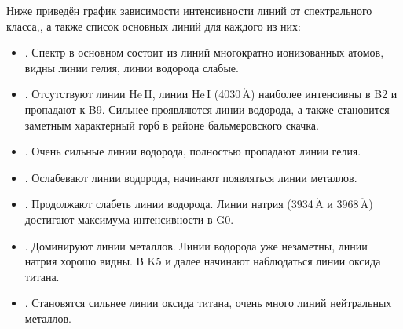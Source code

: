 Ниже приведён график зависимости интенсивности линий от спектрального класса,, а также список основных линий для каждого из них:
\begin{itemize}
	\item {}. Спектр в основном состоит из линий  многократно ионизованных атомов, видны линии гелия, линии водорода слабые.
	\item {}. Отсутствуют линии He$\,$II, линии He$\,$I (4030$\,\mathring{\text{A}}$) наиболее интенсивны в B2 и пропадают к B9. Сильнее проявляются линии водорода, а также становится заметным характерный горб в районе бальмеровского скачка.
	\item {}. Очень сильные линии водорода, полностью пропадают линии гелия.
	\item {}. Ослабевают линии водорода, начинают появляться линии  металлов.
	\item {}. Продолжают слабеть линии водорода. Линии натрия (3934$\,\mathring{\text{A}}$ и 3968$\,\mathring{\text{A}}$) достигают максимума интенсивности в G0.
	\item {}. Доминируют линии металлов. Линии водорода уже незаметны, линии натрия хорошо видны. В K5 и далее начинают наблюдаться линии оксида титана.
	\item {}. Становятся сильнее линии оксида титана, очень много линий нейтральных металлов.
\end{itemize}

